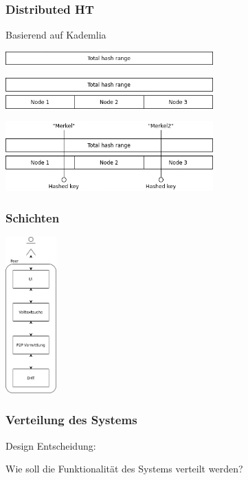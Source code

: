 \documentclass{beamer}
\begin{document}
\begin{frame}[allowframebreaks]
  \frametitle{Distributed HT}
  Basierend auf Kademlia

  \bigskip

  \includegraphics[width=8cm]{dht1}

  \break

  \includegraphics[width=8cm]{dht2}

  \break

  \includegraphics[width=8cm]{dht3}
\end{frame}

\begin{frame}
  \frametitle{Schichten}

  \begin{center}
    \includegraphics[height=6cm]{Schichten-alt}
  \end{center}
\end{frame}

\begin{frame}
  \frametitle{Verteilung des Systems}

  Design Entscheidung:

  Wie soll die Funktionalität des Systems verteilt werden?
\end{frame}
\end{document}
